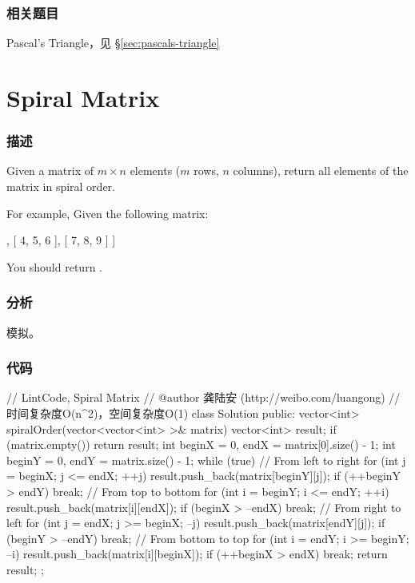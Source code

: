 \subsubsection{相关题目}
\begindot
\item Pascal's Triangle，见 \S \ref{sec:pascals-triangle}
\myenddot


\section{Spiral Matrix} %
\label{sec:spiral-matrix}


\subsubsection{描述}
Given a matrix of $m \times n$ elements ($m$ rows, $n$ columns), return all elements of the matrix in spiral order.

For example,
Given the following matrix:
\begin{Code}
[
 [ 1, 2, 3 ],
 [ 4, 5, 6 ],
 [ 7, 8, 9 ]
]
\end{Code}
You should return \fn{[1,2,3,6,9,8,7,4,5]}.


\subsubsection{分析}
模拟。

\subsubsection{代码}
\begin{Code}
// LintCode, Spiral Matrix
// @author 龚陆安 (http://weibo.com/luangong)
// 时间复杂度O(n^2)，空间复杂度O(1)
class Solution {
public:
    vector<int> spiralOrder(vector<vector<int> >& matrix) {
        vector<int> result;
        if (matrix.empty()) return result;
        int beginX = 0, endX = matrix[0].size() - 1;
        int beginY = 0, endY = matrix.size() - 1;
        while (true) {
            // From left to right
            for (int j = beginX; j <= endX; ++j) result.push_back(matrix[beginY][j]);
            if (++beginY > endY) break;
            // From top to bottom
            for (int i = beginY; i <= endY; ++i) result.push_back(matrix[i][endX]);
            if (beginX > --endX) break;
            // From right to left
            for (int j = endX; j >= beginX; --j) result.push_back(matrix[endY][j]);
            if (beginY > --endY) break;
            // From bottom to top
            for (int i = endY; i >= beginY; --i) result.push_back(matrix[i][beginX]);
            if (++beginX > endX) break;
        }
        return result;
    }
};
\end{Code}


